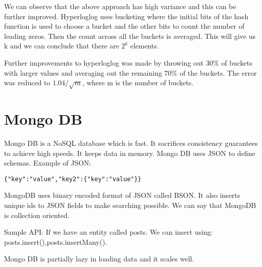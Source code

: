 \documentclass[twoside]{article}
\begin{document}
We can observe that the above approach has high variance and this can be further improved. Hyperloglog uses bucketing where the initial bits of the hash function is used to choose a bucket and the other bits to count the number of leading zeros. Then the count across all the buckets is averaged. This will give us k and we can conclude that there are $2^k$ elements. 
\par

Further improvements to hyperloglog was made by throwing out 30\% of buckets with larger values and averaging out the remaining 70\% of the buckets. The error was reduced to $1.04/ \sqrt{m} $, where m is the number of buckets. 


\section{Mongo DB}
Mongo DB is a NoSQL database which is fast. It sacrifices consistency guarantees to achieve high speeds. It keeps data in memory. Mongo DB uses JSON to define schemas. Example of JSON:
\begin{lstlisting}
{"key":"value","key2":{"key":"value"}}
\end{lstlisting}
\par
MongoDB uses binary encoded format of JSON called BSON. It also inserts unique ids to JSON fields to make searching possible. We can say that MongoDB is collection oriented. 
\par
Sample API: 
If we have an entity called posts. We can insert using:
posts.insert(),posts.insertMany(). 
\par
Mongo DB is partially lazy in loading data and it scales well. 
\end{document}
